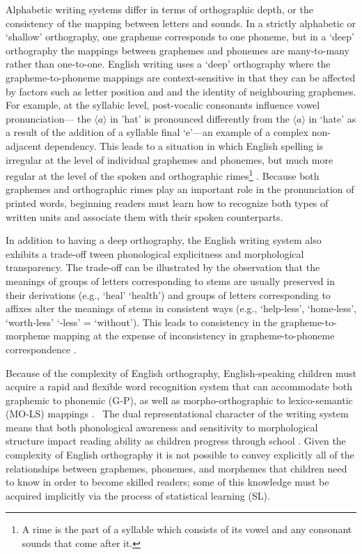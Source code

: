 \documentclass[review]{elsarticle}
\begin{document}
Alphabetic writing systems differ in terms of orthographic depth, or the consistency of the mapping between letters and sounds. In a strictly alphabetic or ‘shallow’ orthography, one grapheme corresponds to one phoneme, but in a ‘deep’ orthography the mappings between graphemes and phonemes  are many-to-many rather than one-to-one. 
English writing uses a ‘deep’  orthography where the grapheme-to-phoneme mappings are  context-sensitive in that they can be affected by factors such as letter position and and the identity of neighbouring graphemes. For example, at the syllabic level, post-vocalic consonants influence vowel pronunciation--- the $\langle a\rangle$ in ’hat’ is pronounced differently from the  $\langle a\rangle$ in ‘hate’ as a result of the addition of a syllable final ‘e’---an example of a complex non-adjacent dependency. This leads to a situation in which English spelling is irregular at the level of individual graphemes and phonemes, but much more regular at the level of the spoken and orthographic rimes\footnote{A rime is the part of a syllable which consists of its vowel and any consonant sounds that come after it.} \citep{treiman_special_1995}. Because both graphemes and orthographic rimes play an important role in the pronunciation of printed words, beginning readers must learn how to recognize both types of written units and associate them with their spoken counterparts.

In addition to having a deep orthography, the English writing system also exhibits a trade-off tween phonological explicitness and morphological transparency. The trade-off can be illustrated by the observation that the meanings of groups of letters corresponding to stems are usually preserved in their derivations (e.g., ‘heal’ \textrightarrow ‘health’) and groups of letters corresponding to affixes alter the meanings of stems in consistent ways (e.g., ‘help‑less’, ‘home‑less’, ‘worth‑less’ \textrightarrow ‘‑less’ = ‘without’).  This leads to consistency in the grapheme-to-morpheme mapping at the expense of inconsistency in grapheme-to-phoneme correspondence \citep{ziegler_reading_2005}.

Because of the complexity of English orthography, English-speaking children must acquire a rapid and flexible word recognition system that can accommodate both graphemic to phonemic (G‑P), as well as morpho-orthographic to lexico-semantic (MO‑LS) mappings \citep{ziegler_reading_2005}.  The dual representational character of the  writing system means that both phonological awareness and sensitivity to morphological structure impact reading ability as children progress through school \citep{mahony_reading_2000-1}.  Given the complexity of English orthography it is not possible to convey explicitly all of the relationships between graphemes, phonemes, and morphemes that children need to know in order to become skilled readers; some of this knowledge must be acquired implicitly via the process of statistical learning (SL). 
\end{document}
